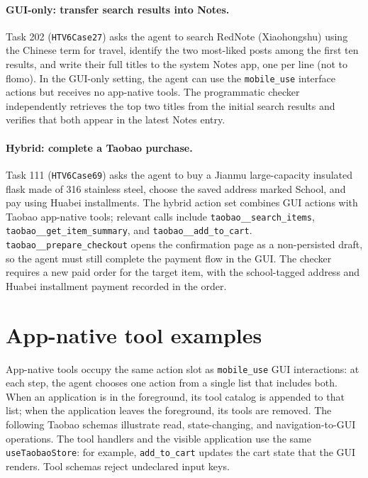 \paragraph{GUI-only: transfer search results into Notes.}
Task 202 (\texttt{HTV6Case27}) asks the agent to search RedNote (Xiaohongshu) using the Chinese term for travel, identify the two most-liked posts among the first ten results, and write their full titles to the system Notes app, one per line (not to flomo). In the GUI-only setting, the agent can use the \texttt{mobile\_use} interface actions but receives no app-native tools. The programmatic checker independently retrieves the top two titles from the initial search results and verifies that both appear in the latest Notes entry.

\paragraph{Hybrid: complete a Taobao purchase.}
Task 111 (\texttt{HTV6Case69}) asks the agent to buy a Jianmu large-capacity insulated flask made of 316 stainless steel, choose the saved address marked School, and pay using Huabei installments. The hybrid action set combines GUI actions with Taobao app-native tools; relevant calls include \texttt{taobao\_\_search\_items}, \texttt{taobao\_\_get\_item\_summary}, and \texttt{taobao\_\_add\_to\_cart}. \texttt{taobao\_\_prepare\_checkout} opens the confirmation page as a non-persisted draft, so the agent must still complete the payment flow in the GUI. The checker requires a new paid order for the target item, with the school-tagged address and Huabei installment payment recorded in the order.

\section{App-native tool examples}
\label{app:tool-schema}
App-native tools occupy the same action slot as \texttt{mobile\_use} GUI interactions: at each step, the agent chooses one action from a single list that includes both. When an application is in the foreground, its tool catalog is appended to that list; when the application leaves the foreground, its tools are removed. The following Taobao schemas illustrate read, state-changing, and navigation-to-GUI operations. The tool handlers and the visible application use the same \texttt{useTaobaoStore}: for example, \texttt{add\_to\_cart} updates the cart state that the GUI renders. Tool schemas reject undeclared input keys.

